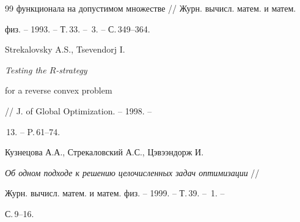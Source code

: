 \begin{thebibliography}{99}
{функционала на допустимом множестве} // Журн. вычисл. матем. и матем.


физ. -- 1993. -- Т.\,33. -- \No\,3. -- С.\,349--364.




Strekalovsky A.S., Tsevendorj I. {\em Testing the $R$-strategy


for a reverse convex problem} // J. of Global Optimization. -- 1998. --


\No\,13. -- P.\,61--74.




Кузнецова А.А., Стрекаловский А.С., Цэвээндорж И. 


{\em Об одном подходе к решению целочисленных задач оптимизации} //


Журн. вычисл. матем. и матем. физ. -- 1999. -- Т.\,39. -- \No\,1. --


С.\,9--16. 





\end{thebibliography}





\vskip 2cm














\label{end}





